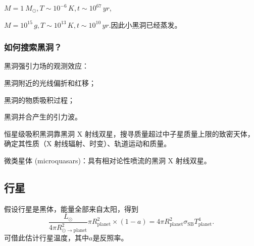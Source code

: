 \documentclass[../天体物理基础.tex]{subfiles}
\begin{document}
$M=\qty{1}{M_{\odot}},T\sim10^{-6}\,\unit{K},t\sim10^{67}\,\unit{yr}$,

$M=10^{15}\,\unit{g},T\sim10^{13}\,\unit{K},t\sim10^{10}\,\unit{yr}$.因此小黑洞已经蒸发。

\subsubsection{如何搜索黑洞？}
黑洞强引力场的观测效应：

黑洞附近的光线偏折和红移；

黑洞的物质吸积过程；

黑洞并合产生的引力波。

恒星级吸积黑洞靠黑洞 X 射线双星，搜寻质量超过中子星质量上限的致密天体，确定其性质（X 射线辐射、时变）、轨道运动和质量。

微类星体 (microquasars)：具有相对论性喷流的黑洞 X 射线双星。


\subsection{行星}
假设行星是黑体，能量全部来自太阳，得到
\begin{equation}
\frac{L_{\odot}}{4\pi R^{2}_{\odot\to\text{planet}}}\pi R_{\text{planet}}^{2}\times\left(1-a\right)=4\pi R_{\text{planet}}^{2}\sigma_{\text{SB}}T_{\text{planet}}^{4}.
\end{equation}
可借此估计行星温度，其中$a$是反照率。

\printbibliography
\end{document}
